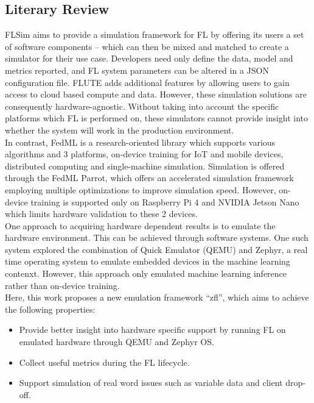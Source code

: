 \documentclass[12pt]{article}
\begin{document}
\subsection{Literary Review}
FLSim\cite{li_2021_flsim} aims to provide a simulation framework for FL by offering its users a set
of software components --
which can then be mixed and matched to create a simulator for their use case. Developers need only
define the data, model and metrics reported, and FL system parameters can be altered in a JSON
configuration file. FLUTE\cite{garcia_2022_flute} adds additional features by allowing users to gain access to cloud based
compute and data. However, these simulation solutions are consequently hardware-agnostic. Without
taking into account the specific platforms which FL is performed on, these simulators cannot provide
insight into whether the system will work in the production environment.\\

In contrast, FedML\cite{he_2020_fedml} is a research-oriented library which supports various algorithms and 3 platforms, on-device training for IoT and
mobile devices, distributed computing and single-machine simulation.
Simulation is offered through the FedML Parrot\cite{tang_2023_fedml}, which offers an accelerated simulation
framework employing multiple optimizations to improve simulation speed.
However, on-device training is supported only on Raspberry Pi 4 and NVIDIA Jetson Nano which limits
hardware validation to these 2 devices.\\

One approach to acquiring hardware dependent results is to emulate the hardware environment. This
can be achieved through software systems. One such system explored the combination of Quick Emulator (QEMU)
and Zephyr, a real time operating system to emulate embedded devices in the machine learning contenxt\cite{ntu}. However,
this approach only emulated machine learning inference rather than on-device training.\\

Here, this work proposes a new emulation framework ``zfl'', which aims to achieve the following
properties:
\begin{itemize}
  \item Provide better insight into hardware specific support by running FL on emulated hardware
    through QEMU and Zephyr OS.
  \item Collect useful metrics during the FL lifecycle.
  \item Support simulation of real word issues such as variable data and client drop-off.
\end{itemize}
\end{document}
